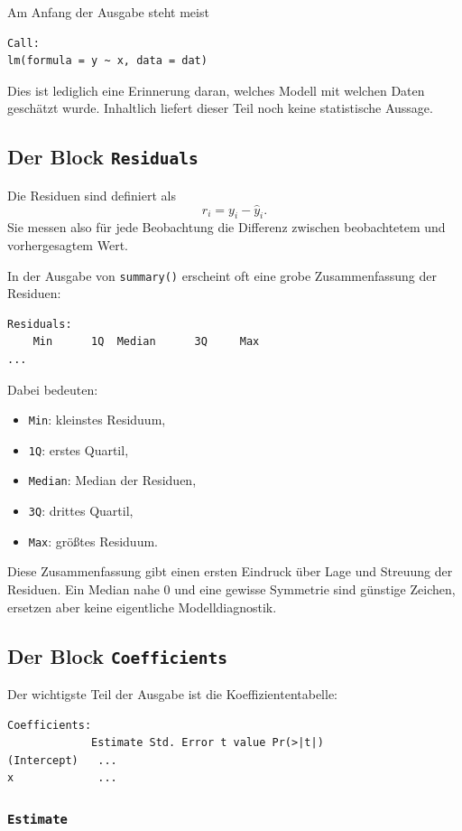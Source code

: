 \documentclass[10pt, letterpaper]{article}
\begin{document}
Am Anfang der Ausgabe steht meist
\begin{verbatim}
Call:
lm(formula = y ~ x, data = dat)
\end{verbatim}
Dies ist lediglich eine Erinnerung daran, welches Modell mit welchen Daten geschätzt wurde. Inhaltlich liefert dieser Teil noch keine statistische Aussage.

\subsection{Der Block \texttt{Residuals}}

Die Residuen sind definiert als
\[
r_i=y_i-\hat y_i.
\]
Sie messen also für jede Beobachtung die Differenz zwischen beobachtetem und vorhergesagtem Wert.

In der Ausgabe von \texttt{summary()} erscheint oft eine grobe Zusammenfassung der Residuen:
\begin{verbatim}
Residuals:
    Min      1Q  Median      3Q     Max
...
\end{verbatim}
Dabei bedeuten:
\begin{itemize}
    \item \texttt{Min}: kleinstes Residuum,
    \item \texttt{1Q}: erstes Quartil,
    \item \texttt{Median}: Median der Residuen,
    \item \texttt{3Q}: drittes Quartil,
    \item \texttt{Max}: größtes Residuum.
\end{itemize}

Diese Zusammenfassung gibt einen ersten Eindruck über Lage und Streuung der Residuen. Ein Median nahe \(0\) und eine gewisse Symmetrie sind günstige Zeichen, ersetzen aber keine eigentliche Modelldiagnostik.

\subsection{Der Block \texttt{Coefficients}}

Der wichtigste Teil der Ausgabe ist die Koeffiziententabelle:
\begin{verbatim}
Coefficients:
             Estimate Std. Error t value Pr(>|t|)
(Intercept)   ...
x             ...
\end{verbatim}

\subsubsection{\texttt{Estimate}}
\end{document}
